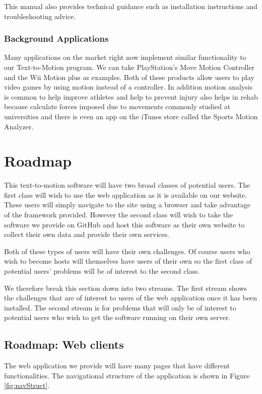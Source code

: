 \documentclass{scrreprt}
\begin{document}
This manual also provides technical guidance such as installation instructions
and troubleshooting advice.

\subsubsection{Background Applications}

Many applications on the market right now implement similar functionality to
our Text-to-Motion program.  We can take PlayStation's Move Motion Controller
and the Wii Motion plus as examples.  Both of these products allow users to
play video games by using motion instead of a controller.  In addition motion
analysis is common to help improve athletes and help to prevent injury also
helps in rehab because calculate forces imposed due to movements commonly
studied at universities and there is even an app on the iTunes store called the
Sports Motion Analyzer.

\section{Roadmap}

This text-to-motion software will have two broad classes of potential users.
The first class will wish to use the web application as it is available on our
website.  These users will simply navigate to the site using a browser and take
advantage of the framework provided. However the second class will wish to take
the software we provide on GitHub and host this software as their own website
to collect their own data and provide their own services.

Both of these types of users will have their own challenges.  Of course users
who wish to become hosts will themselves have users of their own so the first
class of potential users' problems will be of interest to the second class.

We therefore break this section down into two streams.  The first stream shows
the challenges that are of interest to users of the web application once it has
been installed.  The second stream is for problems that will only be of
interest to potential users who wish to get the software running on their own
server.

\subsection{Roadmap: Web clients}

The web application we provide will have many pages that have different
functionalities.  The navigational structure of the application is shown in
Figure \ref{fig:navStruct}.
\end{document}
